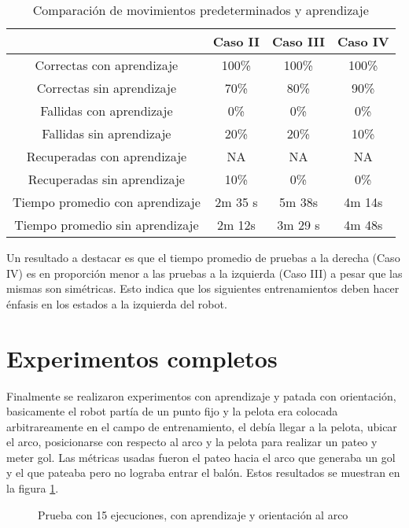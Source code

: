 \begin{table}
\centering
\begin{tabular}{|c|c|c|c|}
\hline  & Caso II & Caso III & Caso IV \\ 
\hline 
Correctas con aprendizaje & 100\% & 100\% & 100\% \\ 
\hline 
Correctas sin aprendizaje & 70\% & 80\% & 90\% \\ 
\hline 
Fallidas con aprendizaje & 0\% & 0\% & 0\% \\ 
\hline 
Fallidas sin aprendizaje & 20\% & 20\% & 10\% \\ 
\hline 
Recuperadas con aprendizaje & NA & NA & NA \\ 
\hline 
Recuperadas sin aprendizaje & 10\% & 0\% & 0\% \\ 
\hline 
Tiempo promedio con aprendizaje & 2m 35 s & 5m 38s & 4m 14s \\ 
\hline 
Tiempo promedio sin aprendizaje & 2m 12s & 3m 29 s & 4m 48s \\
\hline
\end{tabular} 
\caption{Comparaci\'on de movimientos predeterminados y aprendizaje}
\label{tabla:comparacion}

\end{table}

 Un resultado a destacar es que el tiempo promedio de pruebas a la derecha (Caso IV) es en proporci\'on  menor a las pruebas a la izquierda (Caso III) a pesar que las mismas son sim\'etricas. Esto indica que los siguientes entrenamientos deben hacer \'enfasis en los estados a la izquierda del robot.
 
\section{Experimentos completos} \label{completos}

Finalmente se realizaron experimentos con aprendizaje y patada con orientaci\'on, basicamente el robot part\'ia de un punto fijo y la pelota era colocada arbitrareamente en el campo de entrenamiento, el deb\'ia llegar a la pelota, ubicar el arco, posicionarse con respecto al arco y la pelota para realizar un pateo y meter gol.
Las m\'etricas usadas fueron el pateo hacia el arco que generaba un gol y el que pateaba pero no lograba entrar el bal\'on. Estos resultados se muestran en la figura \ref{fig:orientacion}.


\begin{figure}[h]
\centering
{}
\caption{Prueba con 15 ejecuciones, con aprendizaje y orientaci\'on al arco }
\label{fig:orientacion}
\end{figure} 

